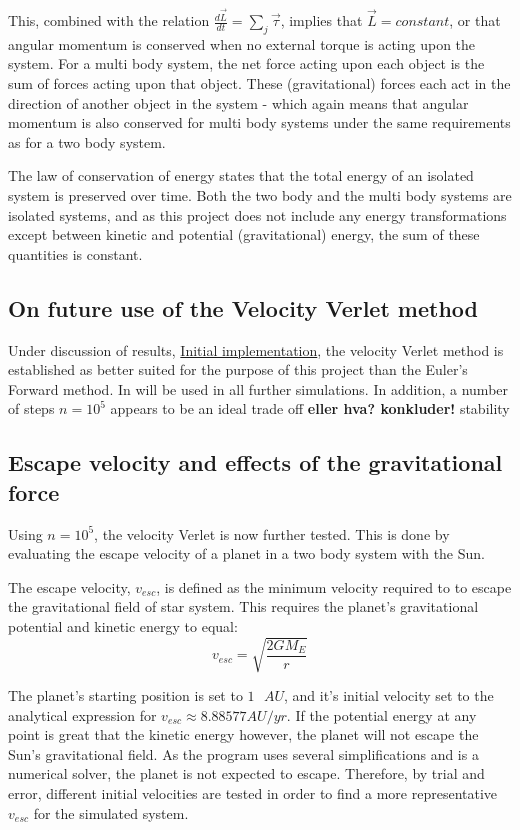 \documentclass[%
oneside,                 %
final,                   %
10pt]{article}
\begin{document}
This, combined with the relation $\frac{d \vec{L}}{dt} = \sum_j \vec{\tau}$, implies that $\vec{L} = constant$, or that angular momentum is conserved when no external torque is acting upon the system. For a multi body system, the net force acting upon each object is the sum of forces acting upon that object. These (gravitational) forces each act in the direction of another object in the system - which again means that angular momentum is also conserved for multi body systems under the same requirements as for a two body system. \newline

The law of conservation of energy states that the total energy of an isolated system is preserved over time. Both the two body and  the multi body systems are isolated systems, and as this project does not include any energy transformations except between kinetic and potential (gravitational) energy, the sum of these quantities  is constant. \newline

\subsection{On future use of the Velocity Verlet method}
Under discussion of results, \hyperref[subsec:Init_implm]{Initial implementation}, the velocity Verlet method is established as better suited for the purpose of this project than the Euler's Forward method. In will be used in all further simulations. In addition, a number of steps $n=10^5$ appears to be an ideal trade off \textbf{eller hva? konkluder!} stability
\subsection{Escape velocity and effects of the gravitational force}
Using $n=10^5$, the velocity Verlet is now further tested. This is done by evaluating the escape velocity of a planet in a two body system with the Sun.  \newline

The escape velocity, $v_{esc}$, is defined as the minimum velocity required to to escape the gravitational field of star system. This requires the planet's gravitational potential and kinetic energy to equal:
\begin{equation}
v_{esc} = \sqrt{\frac{2 G M_E}{r}}
\end{equation}

The planet's starting position is set to $1 \text{ } AU$, and it's initial velocity set to the analytical expression for $v_{esc} \approx 8.88577 AU/yr$. If the potential energy at any point is great that the kinetic energy however, the planet will not escape the Sun's gravitational field. As the program uses several simplifications and is a numerical solver, the planet is not expected to escape. Therefore, by trial and error, different initial velocities are tested in order to find a more representative $v_{esc}$ for the simulated system.\newline
\end{document}
